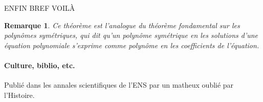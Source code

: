 \documentclass[a4paper, 11pt]{article}
\newtheorem*{remark}{Remarque}
\begin{document}
ENFIN BREF VOILÀ

\begin{remark}
  Ce théorème est l'analogue du théorème fondamental sur les polynômes
  symétriques, qui dit qu'un polynôme symétrique en les solutions d'une équation
  polynomiale s'exprime comme polynôme en les coefficients de l'équation.
\end{remark}

\paragraph{Culture, biblio, etc.}

Publié dans les annales scientifiques de l'ENS par un matheux oublié par
l'Histoire. 
\end{document}
